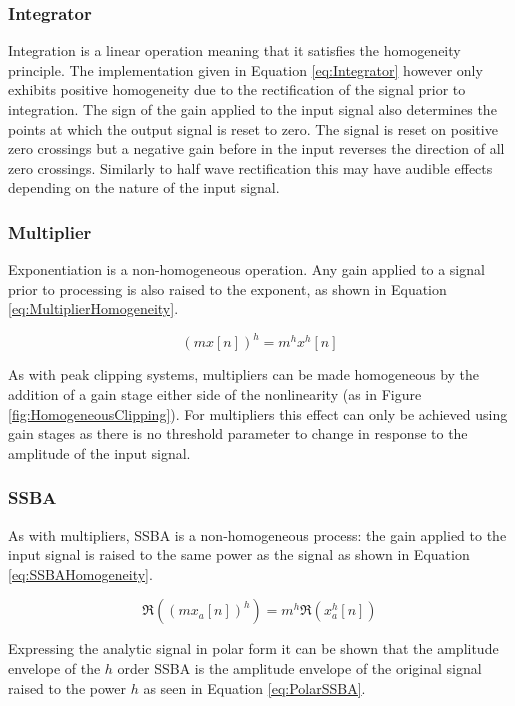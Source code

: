 		\subsubsection*{Integrator}
			Integration is a linear operation meaning that it satisfies the homogeneity principle. The
			implementation given in Equation \ref{eq:Integrator} however only exhibits positive homogeneity due
			to the rectification of the signal prior to integration. The sign of the gain applied to the input
			signal also determines the points at which the output signal is reset to zero. The signal is reset
			on positive zero crossings but a negative gain before in the input reverses the direction of all
			zero crossings. Similarly to half wave rectification this may have audible effects depending on the
			nature of the input signal.

		\subsubsection*{Multiplier}
			Exponentiation is a non-homogeneous operation. Any gain applied to a signal prior to processing is
			also raised to the exponent, as shown in Equation \ref{eq:MultiplierHomogeneity}.

			\begin{equation}
				(mx[n])^{h} = m^{h}x^{h}[n]
				\label{eq:MultiplierHomogeneity}
			\end{equation}

			As with peak clipping systems, multipliers can be made homogeneous by the addition of a gain stage
			either side of the nonlinearity (as in Figure \ref{fig:HomogeneousClipping}). For multipliers this
			effect can only be achieved using gain stages as there is no threshold parameter to change in
			response to the amplitude of the input signal.

		\subsubsection*{SSBA}
			As with multipliers, SSBA is a non-homogeneous process: the gain applied to the input signal is
			raised to the same power as the signal as shown in Equation \ref{eq:SSBAHomogeneity}.

			\begin{equation}
				\Re \left( (mx_{a}[n])^{h} \right) = m^{h} \Re \left( x_{a}^{h}[n] \right)
				\label{eq:SSBAHomogeneity}
			\end{equation}
			
			Expressing the analytic signal in polar form it can be shown that the amplitude envelope of the
			$h$ order SSBA is the amplitude envelope of the original signal raised to the power $h$
			as seen in Equation \ref{eq:PolarSSBA}.

